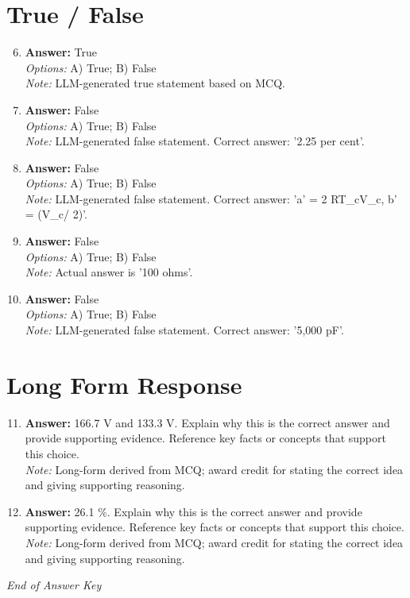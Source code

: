 \documentclass[12pt]{article}
\begin{document}
\section*{True / False}
\begin{enumerate}[label=\arabic*.]
\setcounter{enumi}{5}
\item \textbf{Answer:} True
\\ \textit{Options:} A) True; B) False
\\ \textit{Note:} LLM-generated true statement based on MCQ.
\item \textbf{Answer:} False
\\ \textit{Options:} A) True; B) False
\\ \textit{Note:} LLM-generated false statement. Correct answer: '2.25 per cent'.
\item \textbf{Answer:} False
\\ \textit{Options:} A) True; B) False
\\ \textit{Note:} LLM-generated false statement. Correct answer: 'a' = 2 RT\_cV\_c, b' = (V\_c/ 2)'.
\item \textbf{Answer:} False
\\ \textit{Options:} A) True; B) False
\\ \textit{Note:} Actual answer is '100 ohms'.
\item \textbf{Answer:} False
\\ \textit{Options:} A) True; B) False
\\ \textit{Note:} LLM-generated false statement. Correct answer: '5,000 pF'.
\end{enumerate}

\section*{Long Form Response}
\begin{enumerate}[label=\arabic*.]
\setcounter{enumi}{10}
\item \textbf{Answer:} 166.7 V and 133.3 V. Explain why this is the correct answer and provide supporting evidence. Reference key facts or concepts that support this choice.
\\ \textit{Note:} Long-form derived from MCQ; award credit for stating the correct idea and giving supporting reasoning.
\item \textbf{Answer:} 26.1 \%. Explain why this is the correct answer and provide supporting evidence. Reference key facts or concepts that support this choice.
\\ \textit{Note:} Long-form derived from MCQ; award credit for stating the correct idea and giving supporting reasoning.
\end{enumerate}

\vfill
\noindent\textit{End of Answer Key}
\end{document}
